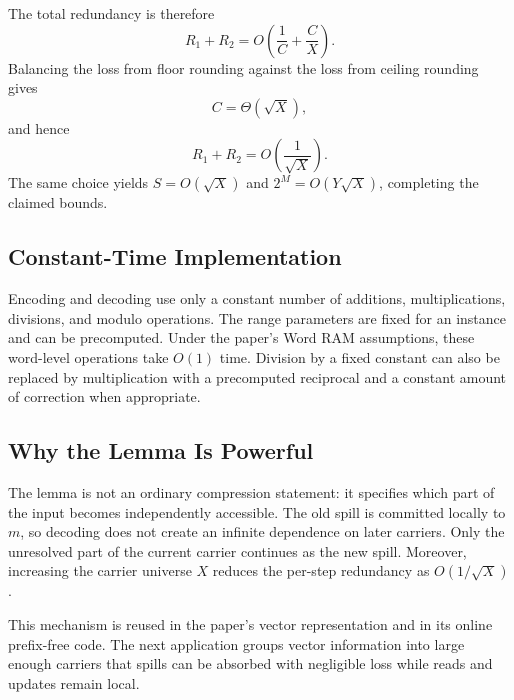 The total redundancy is therefore
\[
    R_1+R_2
    =O\left(
    \frac{1}{C}
    +
    \frac{C}{X}
    \right).
\]
Balancing the loss from floor rounding against the loss from ceiling rounding
gives
\[
    C=\Theta(\sqrt X),
\]
and hence
\[
    R_1+R_2
    =O\left(\frac{1}{\sqrt X}\right).
\]
The same choice yields \(S=O(\sqrt X)\) and
\(2^M=O(Y\sqrt X)\), completing the claimed bounds.

\subsection{Constant-Time Implementation}

Encoding and decoding use only a constant number of additions,
multiplications, divisions, and modulo operations. The range parameters are
fixed for an instance and can be precomputed. Under the paper's Word RAM
assumptions, these word-level operations take \(O(1)\) time. Division by a
fixed constant can also be replaced by multiplication with a precomputed
reciprocal and a constant amount of correction when appropriate.

\subsection{Why the Lemma Is Powerful}

The lemma is not an ordinary compression statement: it specifies which part
of the input becomes independently accessible. The old spill is committed
locally to \(m\), so decoding does not create an infinite dependence on later
carriers. Only the unresolved part of the current carrier continues as the
new spill. Moreover, increasing the carrier universe \(X\) reduces the
per-step redundancy as \(O(1/\sqrt X)\).

This mechanism is reused in the paper's vector representation and in its
online prefix-free code. The next application groups vector information into
large enough carriers that spills can be absorbed with negligible loss while
reads and updates remain local.

